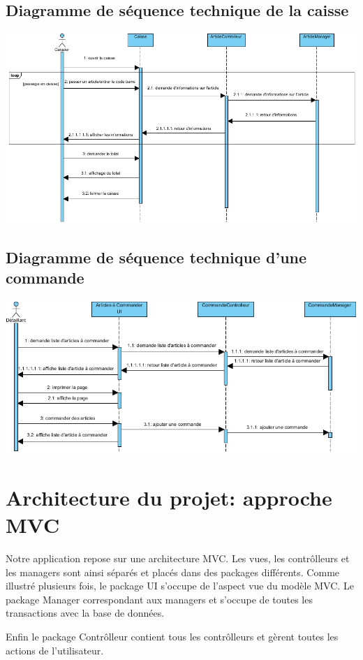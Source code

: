 \subsection{Diagramme de séquence technique de la caisse}
\begin{center}
	\includegraphics[width=15cm]{./Conception/DiagrammedeSequenceCaisse.jpg}
\end{center}

\subsection{Diagramme de séquence technique d'une commande}
\begin{center}
	\includegraphics[width=15cm]{./Conception/DiagrammedeSequenceCommande.jpg}
\end{center}


\section{Architecture du projet: approche MVC}
Notre application repose sur une architecture MVC. Les vues, les contrôlleurs et les managers sont ainsi séparés et placés dans des packages différents.
Comme illustré plusieurs fois, le package UI s'occupe de l'aspect vue du modèle MVC.
Le package Manager correspondant aux managers et s'occupe de toutes les transactions avec la base de données.

Enfin le package Contrôlleur contient tous les contrôlleurs et gèrent toutes les actions de l'utilisateur. 